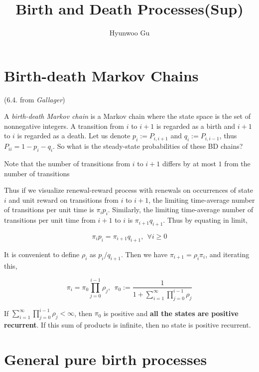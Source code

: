 \documentclass[12pt]{article}
\theoremstyle{nonumberbreak}
\begin{document}
\title{\textbf{Birth and Death Processes(Sup)}}
\author{Hyunwoo Gu}
\date{}

\maketitle

\section*{Birth-death Markov Chains}(6.4. from \textit{Gallager})

A \textit{birth-death Markov chain} is a Markov chain where the state space is the set of nonnegative integers. A transition from $i$ to $i+1$ is regarded as a birth and $i+1$ to $i$ is regarded as a death. Let us denote $p_i := P_{i,i+1}$ and $q_i := P_{i,i-1}$, thus $P_{ii} = 1 - p_i - q_i$. So what is the steady-state probabilities of these BD chains?

Note that the number of transitions from $i$ to $i+1$ differs by at most $1$ from the number of transitions 


Thus if we visualize renewal-reward process with renewals on occurrences of state $i$ and unit reward on transitions from $i$ to $i+1$, the limiting time-average number of transitions per unit time is $\pi_i p_i$. Similarly, the limiting time-average number of transitions per unit time from $i+1$ to $i$ is $\pi_{i+1} q_{i+1}$. Thus by equating in limit,

$$
\pi_i p_i = \pi_{i+1} q_{i+1}, \ \ \forall i\ge 0
$$


It is convenient to define $\rho_i$ as $p_i / q_{i+1}$. Then we have $\pi_{i+1} = \rho_i \pi_i$, and iterating this,

$$
\pi_i = \pi_0 \prod_{j=0}^{i-1} \rho_j, \ \ \pi_0 := \frac{1}{1 + \sum_{i=1}^\infty \prod_{j=0}^{i-1} \rho_j}
$$

If $\sum_{i=1}^\infty \prod_{j=0}^{i-1} \rho_j < \infty$, then $\pi_0$ is positive and \textbf{all the states are positive recurrent}. If this sum of products is infinite, then no state is positive recurrent. 


\section{General pure birth processes}
\end{document}
